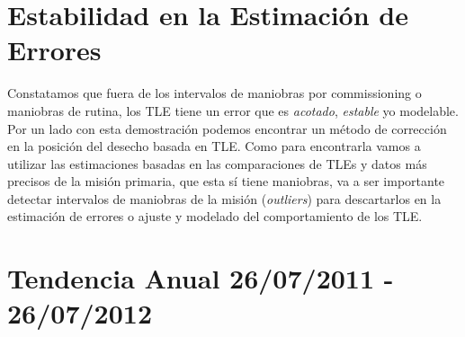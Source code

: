 \section{Estabilidad en la Estimaci\'on de Errores}
Constatamos que fuera de los intervalos de maniobras por commissioning o maniobras de rutina, los TLE tiene un error que es {\it{acotado}}, {\it{estable}} y\/o modelable. Por un lado con esta demostraci\'on podemos encontrar un m\'etodo de correcci\'on en la posici\'on del desecho basada en TLE. Como para encontrarla vamos a utilizar las estimaciones basadas en las comparaciones de TLEs y datos m\'as precisos de la misi\'on primaria, que esta s\'i tiene maniobras, va a ser importante detectar intervalos de maniobras de la misión ({\it{outliers}}) para descartarlos en la estimaci\'on de errores o ajuste y modelado del comportamiento de los TLE.\\


\section*{Tendencia Anual 26/07/2011 - 26/07/2012}

